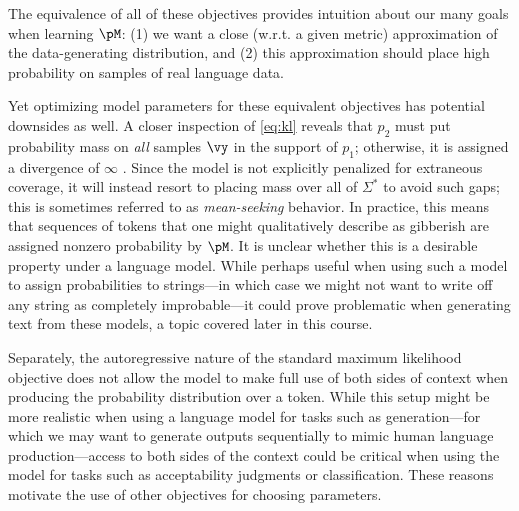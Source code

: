 The equivalence of all of these objectives provides intuition about our many goals when learning $\pM$: (1) we want a close (w.r.t. a given metric) approximation of the data-generating distribution, and (2) this approximation should place high probability on samples of real language data.

Yet optimizing model parameters for these equivalent objectives has potential downsides as well. A closer inspection of \cref{eq:kl} reveals that $p_2$ must put probability mass on \emph{all} samples $\vy$ in the support of $p_1$; otherwise, it is assigned a divergence of $\infty$ . Since the model is not explicitly penalized for extraneous coverage, it will instead resort to placing mass over all of $\Sigma^*$ to avoid such gaps; this is sometimes referred to as \emph{mean-seeking} behavior. In practice, this means that sequences of tokens that one might qualitatively describe as gibberish are assigned nonzero probability by $\pM$. It is unclear whether this is a desirable property under a language model. While perhaps useful when using such a model to assign probabilities to strings---in which case we might not want to write off any string as completely improbable---it could prove problematic when generating text from these models, a topic covered later in this course. 

Separately, the autoregressive nature of the standard maximum likelihood objective does not allow the model to make full use of both sides of context when producing the probability distribution over a token. While this setup might be more realistic when using a language model for tasks such as generation---for which we may want to generate outputs sequentially to mimic human language production---access to both sides of the context could be critical when using the model for tasks such as acceptability judgments or classification. These reasons motivate the use of other objectives for choosing parameters. 


